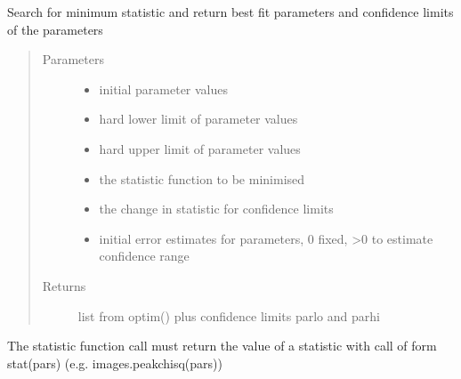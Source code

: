 \documentclass[letterpaper,10pt,english]{sphinxmanual}
\begin{document}
\begin{fulllineitems}
\label{\detokenize{images_functions:images.srchmin}}
Search for minimum statistic and return best fit parameters and confidence limits of the parameters
\begin{quote}\begin{description}
\item[{Parameters}] \leavevmode\begin{itemize}
\item {} 
 \textendash{} initial parameter values

\item {} 
 \textendash{} hard lower limit of parameter values

\item {} 
 \textendash{} hard upper limit of parameter values

\item {} 
 \textendash{} the statistic function to be minimised

\item {} 
 \textendash{} the change in statistic for confidence limits

\item {} 
 \textendash{} initial error estimates for parameters, 0 fixed, \textgreater{}0 to estimate confidence range

\end{itemize}

\item[{Returns}] \leavevmode
list from optim() plus confidence limits parlo and parhi

\end{description}\end{quote}

The statistic function call must return the value of a statistic with call of form stat(pars) (e.g. images.peakchisq(pars))

\end{fulllineitems}

\end{document}
